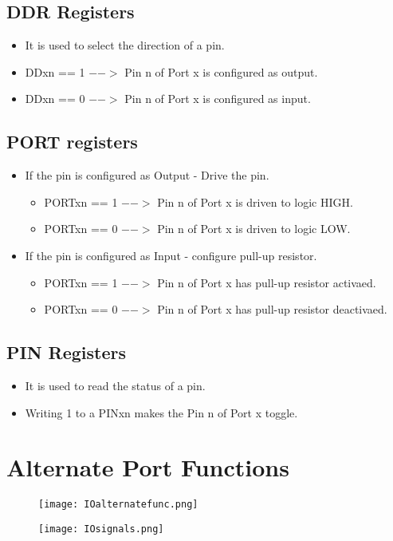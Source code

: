 \subsection{DDR Registers}
\begin{itemize}
    \item It is used to select the direction of a pin.
    \item DDxn == 1 $-->$ Pin n of Port x is configured as output.
    \item DDxn == 0 $-->$ Pin n of Port x is configured as input.
\end{itemize}

\subsection{PORT registers}
\begin{itemize}
    \item If the pin is configured as Output - Drive the pin.
    \begin{itemize}
        \item PORTxn == 1 $-->$ Pin n of Port x is driven to logic HIGH.
        \item PORTxn == 0 $-->$ Pin n of Port x is driven to logic LOW.
    \end{itemize}
    \item If the pin is configured as Input - configure pull-up resistor.
    \begin{itemize}
        \item PORTxn == 1 $-->$ Pin n of Port x has pull-up resistor activaed.
        \item PORTxn == 0 $-->$ Pin n of Port x has pull-up resistor deactivaed.
    \end{itemize}
\end{itemize}

\subsection{PIN Registers}
\begin{itemize}
    \item It is used to read the status of a pin.
    \item Writing 1 to a PINxn makes the Pin n of Port x toggle.
\end{itemize}

\section{Alternate Port Functions}
\begin{figure}[H]
    \begin{center}
        \texttt{[image: IOalternatefunc.png]}
    \end{center}
\end{figure}

\begin{figure}[H]
    \begin{center}
        \texttt{[image: IOsignals.png]}
    \end{center}
\end{figure}


% 

